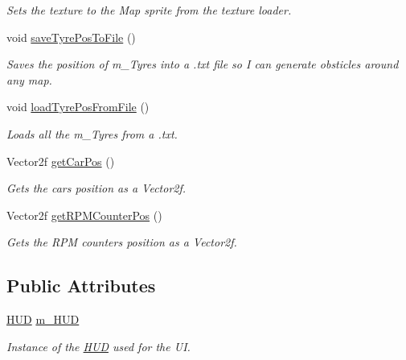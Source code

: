 \begin{DoxyCompactItemize}
\begin{DoxyCompactList}\small\item\em Sets the texture to the Map sprite from the texture loader. \end{DoxyCompactList}\item 
void \hyperlink{class_game_a907fa46ec6aa134985c1845d4cf20de2}{save\+Tyre\+Pos\+To\+File} ()
\begin{DoxyCompactList}\small\item\em Saves the position of m\+\_\+\+Tyres into a .txt file so I can generate obsticles around any map. \end{DoxyCompactList}\item 
void \hyperlink{class_game_a16d92220f4808914017486e36c7e44cb}{load\+Tyre\+Pos\+From\+File} ()
\begin{DoxyCompactList}\small\item\em Loads all the m\+\_\+\+Tyres from a .txt. \end{DoxyCompactList}\item 
Vector2f \hyperlink{class_game_a2e73dcb8b9d6a9fb89c00a5446fbc473}{get\+Car\+Pos} ()
\begin{DoxyCompactList}\small\item\em Gets the cars position as a Vector2f. \end{DoxyCompactList}\item 
Vector2f \hyperlink{class_game_a6c9677367a84a4201e45200a3fc08dcc}{get\+R\+P\+M\+Counter\+Pos} ()
\begin{DoxyCompactList}\small\item\em Gets the R\+P\+M counters position as a Vector2f. \end{DoxyCompactList}\end{DoxyCompactItemize}
\subsection*{Public Attributes}
\begin{DoxyCompactItemize}
\item 
\hypertarget{class_game_a7da845052dc5b3e38721d6a1564f0f82}{}\hyperlink{class_h_u_d}{H\+U\+D} \hyperlink{class_game_a7da845052dc5b3e38721d6a1564f0f82}{m\+\_\+\+H\+U\+D}\label{class_game_a7da845052dc5b3e38721d6a1564f0f82}

\begin{DoxyCompactList}\small\item\em Instance of the \hyperlink{class_h_u_d}{H\+U\+D} used for the U\+I. \end{DoxyCompactList}\end{DoxyCompactItemize}


